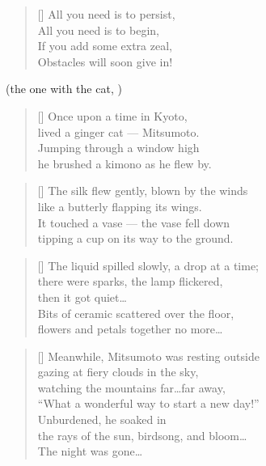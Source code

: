 \begin{multicols}{2}
	\begin{verse}[\versewidth]
		All you need is to persist,\\
		All you need is to begin,\\
		If you add some extra zeal,\\
		Obstacles will soon give in!
	\end{verse}
	
	
\end{multicols}

\clearpage
\PlainPoemTitle
{}
\vspace{-5mm}
\begin{center}
	(the one with the cat, )
\end{center}

\begin{multicols}{2}
	\begin{verse}[\versewidth]
		Once upon a time in Kyoto,\\
		lived a ginger cat --- Mitsumoto.\\
		Jumping through a window high\\
		he brushed a kimono as he flew by.
	\end{verse}
	
	\begin{verse}[\versewidth]
		The silk flew gently, blown by the winds\\
		like a butterly flapping its wings.\\
		It touched a vase --- the vase fell down\\
		tipping a cup on its way to the ground.
	\end{verse}
	
	\begin{verse}[\versewidth]
		The liquid spilled slowly, a drop at a time;\\
		there were sparks, the lamp flickered,\\
		then it got quiet\ldots\\
		Bits of ceramic scattered over the floor,\\
		flowers and petals together no more\ldots
	\end{verse}
	
	
	\begin{verse}[\versewidth]
		Meanwhile, Mitsumoto was resting outside\\
		gazing at fiery clouds in the sky,\\
		watching the mountains far\ldots far away,\\
		``What a wonderful way to start a new day!''\\
		Unburdened, he soaked in\\
		the rays of the sun, birdsong, and bloom\ldots\\
		The night was gone\ldots
	\end{verse}
	


\end{multicols}
